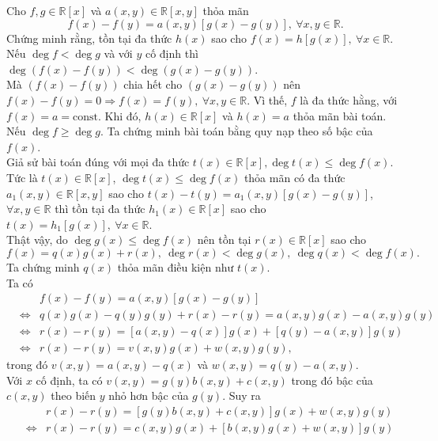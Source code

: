 \begin{bt}
Cho $ f, g\in\mathbb{R}[x] $ và $ a(x, y)\in\mathbb{R}[x, y] $ thỏa mãn $$f(x)-f(y)=a(x, y)\left[g(x)-g(y)\right],\ \forall x, y\in\mathbb{R}.$$
Chứng minh rằng, tồn tại đa thức $ h(x) $ sao cho $ f(x)=h\left[g(x)\right],\ \forall x\in\mathbb{R} $.
\loigiai
{Nếu $ \deg f<\deg g $ và với $ y $ cố định thì $ \deg \left(f(x)-f(y)\right)<\deg \left(g(x)-g(y)\right) $.\\
Mà $ \left(f(x)-f(y)\right)$ chia hết cho $\left(g(x)-g(y)\right) $ nên $ f(x)-f(y)=0\Rightarrow f(x)=f(y),\ \forall x, y\in\mathbb{R} $. Vì thế, $ f $ là đa thức hằng, với $ f(x)=a=\text{const} $. Khi đó, $ h(x)\in\mathbb{R}[x] $ và $ h(x)=a $ thỏa mãn bài toán.\\
Nếu $ \deg f\geq \deg g $. Ta chứng minh bài toán bằng quy nạp theo số bậc của $ f(x) $.\\
Giả sử bài toán đúng với mọi đa thức $ t(x)\in\mathbb{R}[x], \deg t(x)\leq \deg f(x) $. Tức là $ t(x)\in\mathbb{R}[x]$, $\deg t(x)\leq \deg f(x) $ thỏa mãn có đa thức $ a_1(x, y)\in\mathbb{R}[x, y] $ sao cho $ t(x)-t(y)=a_1(x, y)\left[g(x)-g(y)\right]$, $\forall x, y\in\mathbb{R}$  thì tồn tại đa thức $ h_1(x)\in\mathbb{R}[x] $ sao cho $ t(x)=h_1\left[g(x)\right],\ \forall x\in\mathbb{R} $.\\
Thật vậy, do $ \deg g(x)\leq \deg f(x) $ nên tồn tại $ r(x)\in\mathbb{R}[x] $ sao cho $$f(x)=q(x)g(x)+r(x),\ \deg r(x)<\deg g(x),\ \deg q(x)<\deg f(x).$$
Ta chứng minh $ q(x) $ thỏa mãn điều kiện như $ t(x) $.\\
Ta có \begin{eqnarray*}
	&& f(x)-f(y)=a(x, y)\left[g(x)-g(y)\right]\\
	&\Leftrightarrow & q(x)g(x)-q(y)g(y)+r(x)-r(y)=a(x, y)g(x)-a(x, y)g(y)\\
	&\Leftrightarrow & r(x)-r(y)=\left[a(x, y)-q(x)\right]g(x)+\left[q(y)-a(x,y)\right]g(y)\\
	&\Leftrightarrow & r(x)-r(y)=v(x, y)g(x)+w(x, y)g(y),
\end{eqnarray*}
trong đó $ v(x, y)=a(x, y)-q(x) $ và $ w(x, y)=q(y)-a(x, y) $.\\
Với $ x $ cố định, ta có $ v(x, y)=g(y)b(x, y)+c(x, y) $ trong đó bậc của $ c(x, y) $ theo biến $ y $ nhỏ hơn bậc của $ g(y) $. Suy ra \begin{eqnarray*}
	&& r(x)-r(y)=\left[g(y)b(x, y)+c(x, y)\right]g(x)+w(x, y)g(y)\\
	&\Leftrightarrow & r(x)-r(y)=c(x, y)g(x)+\left[b(x, y)g(x)+w(x, y)\right]g(y)\\

\end{eqnarray*}}
\end{bt}
